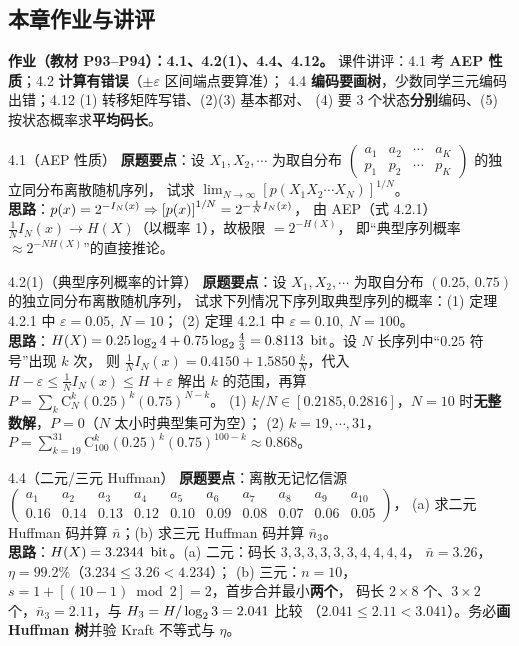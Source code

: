 \subsection{本章作业与讲评}

\textbf{作业（教材 P93--P94）：4.1、4.2(1)、4.4、4.12。}
课件讲评：4.1 考 \textbf{AEP 性质}；4.2 \textbf{计算有错误}（$\pm\varepsilon$ 区间端点要算准）；
4.4 \textbf{编码要画树}，少数同学三元编码出错；4.12 (1) 转移矩阵写错、(2)(3) 基本都对、
(4) 要 3 个状态\textbf{分别}编码、(5) 按状态概率求\textbf{平均码长}。

\begin{example}{4.1（AEP 性质）}
\textbf{原题要点}：设 $X_1,X_2,\cdots$ 为取自分布
$\begin{pmatrix}a_1&a_2&\cdots&a_K\\p_1&p_2&\cdots&p_K\end{pmatrix}$ 的独立同分布离散随机序列，
试求 $\displaystyle\lim_{N\to\infty}\left[p(X_1X_2\cdots X_N)\right]^{1/N}$。\\
\textbf{思路}：$p\!\left(x\right)=2^{-I_N(x)}\Rightarrow\left[p\!\left(x\right)\right]^{1/N}=2^{-\frac1NI_N(x)}$，
由 AEP（式 4.2.1）$\frac1NI_N(x)\to H(X)$（以概率 1），故极限 $=2^{-H(X)}$，
即“典型序列概率 $\approx2^{-NH(X)}$”的直接推论。
\end{example}

\begin{example}{4.2(1)（典型序列概率的计算）}
\textbf{原题要点}：设 $X_1,X_2,\cdots$ 为取自分布 $(0.25,\ 0.75)$ 的独立同分布离散随机序列，
试求下列情况下序列取典型序列的概率：(1) 定理 4.2.1 中 $\varepsilon=0.05,\ N=10$；
(2) 定理 4.2.1 中 $\varepsilon=0.10,\ N=100$。\\
\textbf{思路}：$H(X)=0.25\lb4+0.75\lb\frac43=0.8113\ \bit$。设 $N$ 长序列中“$0.25$ 符号”出现 $k$ 次，
则 $\frac1NI_N(x)=0.4150+1.5850\,\frac kN$，代入 $H-\varepsilon\le\frac1NI_N(x)\le H+\varepsilon$
解出 $k$ 的范围，再算 $P=\sum_k\mathrm{C}_N^{k}(0.25)^k(0.75)^{N-k}$。
(1) $k/N\in[0.2185,0.2816]$，$N=10$ 时\textbf{无整数解}，$P=0$（$N$ 太小时典型集可为空）；
(2) $k=19,\cdots,31$，$P=\sum_{k=19}^{31}\mathrm{C}_{100}^{k}(0.25)^k(0.75)^{100-k}\approx0.868$。
\end{example}

\begin{example}{4.4（二元/三元 Huffman）}
\textbf{原题要点}：离散无记忆信源
$\begin{pmatrix}a_1&a_2&a_3&a_4&a_5&a_6&a_7&a_8&a_9&a_{10}\\
0.16&0.14&0.13&0.12&0.10&0.09&0.08&0.07&0.06&0.05\end{pmatrix}$，
(a) 求二元 Huffman 码并算 $\bar n$；(b) 求三元 Huffman 码并算 $\bar n_3$。\\
\textbf{思路}：$H(X)=3.2344\ \bit$。(a) 二元：码长 $3,3,3,3,3,3,4,4,4,4$，
$\bar n=3.26$，$\eta=99.2\%$（$3.234\le3.26<4.234$）；
(b) 三元：$n=10$，$s=1+[(10-1)\bmod2]=2$，首步合并最小\textbf{两个}，
码长 $2\times8$ 个、$3\times2$ 个，$\bar n_3=2.11$，与 $H_3=H/\log_{2}3=2.041$ 比较
（$2.041\le2.11<3.041$）。务必\textbf{画 Huffman 树}并验 Kraft 不等式与 $\eta$。
\end{example}

